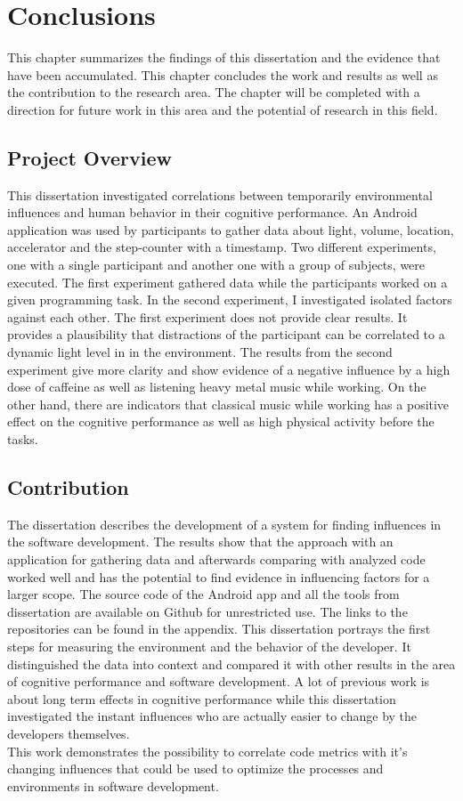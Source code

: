 \chapter{Conclusions}
This chapter summarizes the findings of this dissertation and the evidence that have been accumulated. This chapter concludes the work and results as well as the contribution to the research area. 
The chapter will be completed with a direction for future work in this area and the potential of research in this field. 

\section{Project Overview}
This dissertation investigated correlations between temporarily environmental influences and human behavior in their cognitive performance. 
An Android application was used by participants to gather data about light, volume, location, accelerator and the step-counter with a timestamp.  
Two different experiments, one with a single participant and another one with a group of subjects, were executed. The first experiment gathered data while the participants worked on a given programming task. In the second experiment, I investigated isolated factors against each other.
The first experiment does not provide clear results. It provides a plausibility that distractions of the participant can be correlated to a dynamic light level in in the environment. 
The results from the second experiment give more clarity and show evidence of a negative influence by a high dose of caffeine as well as listening heavy metal music while working. On the other hand, there are indicators that classical music while working has a positive effect on the cognitive performance  as well as high physical activity before the tasks. 

\section{Contribution}
The dissertation describes the development of a system for finding influences in the software development. The results show that the approach with an application for gathering data and afterwards comparing with analyzed code worked well and has the potential to find evidence in influencing factors for a larger scope.
The source code of the Android app and all the tools from dissertation are available on Github for unrestricted use. The links to the repositories can be found in the appendix. 
\bigbreak
This dissertation portrays the first steps for measuring the environment and the behavior of the developer. It distinguished the data into context and compared it with other results in the area of cognitive performance and software development. A lot of previous work is about long term effects in cognitive performance while this dissertation investigated the instant influences who are actually easier to change by the developers themselves.\\
This work demonstrates the possibility to correlate code metrics with it's changing influences that could be used to optimize the processes and environments in software development. 

